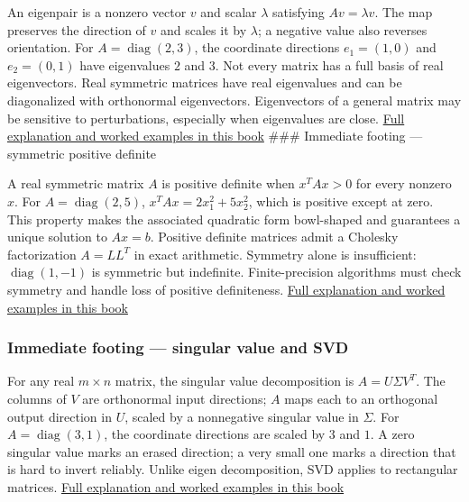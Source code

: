An eigenpair is a nonzero vector \(v\) and scalar \(\lambda\) satisfying \(Av=\lambda v\). The map preserves the direction of \(v\) and scales it by \(\lambda\); a negative value also reverses orientation. For \(A=\operatorname{diag}(2,3)\), the coordinate directions \(e_1=(1,0)\) and \(e_2=(0,1)\) have eigenvalues \(2\) and \(3\). Not every matrix has a full basis of real eigenvectors. Real symmetric matrices have real eigenvalues and can be diagonalized with orthonormal eigenvectors. Eigenvectors of a general matrix may be sensitive to perturbations, especially when eigenvalues are close. \hyperref[01-foundations-i-ch020-eigenvectors-reveal-the-directions-a-square-map-does-not-turn]{Full explanation and worked examples in this book} \#\#\# Immediate footing --- symmetric positive definite

A real symmetric matrix \(A\) is positive definite when \(x^TAx>0\) for every nonzero \(x\). For \(A=\operatorname{diag}(2,5)\), \(x^TAx=2x_1^2+5x_2^2\), which is positive except at zero. This property makes the associated quadratic form bowl-shaped and guarantees a unique solution to \(Ax=b\). Positive definite matrices admit a Cholesky factorization \(A=LL^T\) in exact arithmetic. Symmetry alone is insufficient: \(\operatorname{diag}(1,-1)\) is symmetric but indefinite. Finite-precision algorithms must check symmetry and handle loss of positive definiteness. \hyperref[01-foundations-i-ch020-positive-definiteness-is-a-structural-promise]{Full explanation and worked examples in this book}

\subsubsection{Immediate footing --- singular value and SVD}\label{01-foundations-i-ch018-immediate-footing-singular-value-and-svd}

\hypertarget{01-foundations-i-ch018-immediate-footing-singular-value-and-svd}{}

For any real \(m\times n\) matrix, the singular value decomposition is \(A=U\Sigma V^T\). The columns of \(V\) are orthonormal input directions; \(A\) maps each to an orthogonal output direction in \(U\), scaled by a nonnegative singular value in \(\Sigma\). For \(A=\operatorname{diag}(3,1)\), the coordinate directions are scaled by \(3\) and \(1\). A zero singular value marks an erased direction; a very small one marks a direction that is hard to invert reliably. Unlike eigen decomposition, SVD applies to rectangular matrices. \hyperref[02-foundations-ii-ch024-singular-value-decomposition-covers-every-rectangular-map]{Full explanation and worked examples in this book}

